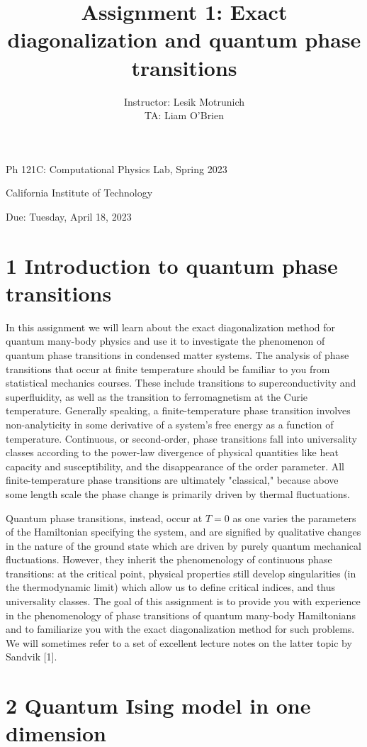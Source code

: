 \documentclass[10pt]{article}
\title{Assignment 1: Exact diagonalization and quantum phase transitions }
\author{Instructor: Lesik Motrunich\\
TA: Liam O'Brien}
\date{}
\begin{document}
\maketitle
Ph 121C: Computational Physics Lab, Spring 2023

California Institute of Technology

Due: Tuesday, April 18, 2023

\section*{1 Introduction to quantum phase transitions}
In this assignment we will learn about the exact diagonalization method for quantum many-body physics and use it to investigate the phenomenon of quantum phase transitions in condensed matter systems. The analysis of phase transitions that occur at finite temperature should be familiar to you from statistical mechanics courses. These include transitions to superconductivity and superfluidity, as well as the transition to ferromagnetism at the Curie temperature. Generally speaking, a finite-temperature phase transition involves non-analyticity in some derivative of a system's free energy as a function of temperature. Continuous, or second-order, phase transitions fall into universality classes according to the power-law divergence of physical quantities like heat capacity and susceptibility, and the disappearance of the order parameter. All finite-temperature phase transitions are ultimately "classical," because above some length scale the phase change is primarily driven by thermal fluctuations.

Quantum phase transitions, instead, occur at $T=0$ as one varies the parameters of the Hamiltonian specifying the system, and are signified by qualitative changes in the nature of the ground state which are driven by purely quantum mechanical fluctuations. However, they inherit the phenomenology of continuous phase transitions: at the critical point, physical properties still develop singularities (in the thermodynamic limit) which allow us to define critical indices, and thus universality classes. The goal of this assignment is to provide you with experience in the phenomenology of phase transitions of quantum many-body Hamiltonians and to familiarize you with the exact diagonalization method for such problems. We will sometimes refer to a set of excellent lecture notes on the latter topic by Sandvik [1].

\section*{2 Quantum Ising model in one dimension}
\end{document}
